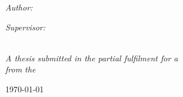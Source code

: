 \documentclass[
11pt,
oneside, 
english,
singlespacing,
headsepline, 
fleqn
]{MastersDoctoralThesis}
\begin{document}
\begin{titlepage}
\begin{center}
\begin{minipage}[t]{0.4\textwidth}
\begin{flushleft} \large
\emph{Author:}\\
\href{https://devon12stone.github.io/E-Portfolio2/}{\authorname} %
\end{flushleft}
\end{minipage}
\begin{minipage}[t]{0.4\textwidth}
\begin{flushright} \large
\emph{Supervisor:} \\
\href{http://www.jamessmith.com}{\supname} %
\end{flushright}
\end{minipage}\\
\vspace{2cm}
\large \textit{A thesis submitted in the partial fulfilment for a \degreename}\\[0.3cm] %
\textit{from the}\\[1cm]
{\scshape\LARGE\facname\par}\vspace{1cm} %
{\large \today}\\[2cm] %
\vfill
\end{center}
\end{titlepage}

\end{document}
